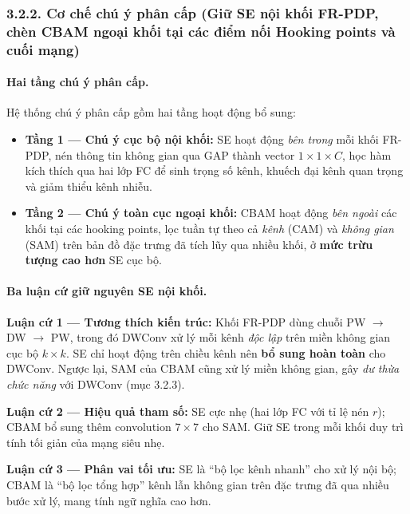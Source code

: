 \documentclass[
]{article}
\begin{document}
\subsubsection{3.2.2. Cơ chế chú ý phân cấp (Giữ SE nội khối FR-PDP, chèn CBAM ngoại khối tại các điểm nối Hooking points và cuối mạng)}\label{3-2-2-hierarchical-attention}

\paragraph{Hai tầng chú ý phân cấp.}

Hệ thống chú ý phân cấp gồm hai tầng hoạt động bổ sung:

\begin{itemize}
\item \textbf{Tầng 1 --- Chú ý cục bộ nội khối:} SE hoạt động \textit{bên trong} mỗi khối FR-PDP, nén thông tin không gian qua GAP thành vector $1 \times 1 \times C$, học hàm kích thích qua hai lớp FC để sinh trọng số kênh, khuếch đại kênh quan trọng và giảm thiểu kênh nhiễu.

\item \textbf{Tầng 2 --- Chú ý toàn cục ngoại khối:} CBAM hoạt động \textit{bên ngoài} các khối tại các hooking points, lọc tuần tự theo cả \textit{kênh} (CAM) và \textit{không gian} (SAM) trên bản đồ đặc trưng đã tích lũy qua nhiều khối, ở \textbf{mức trừu tượng cao hơn} SE cục bộ.
\end{itemize}

\paragraph{Ba luận cứ giữ nguyên SE nội khối.}

\textbf{Luận cứ 1 --- Tương thích kiến trúc:} Khối FR-PDP dùng chuỗi PW $\rightarrow$ DW $\rightarrow$ PW, trong đó DWConv xử lý mỗi kênh \textit{độc lập} trên miền không gian cục bộ $k \times k$. SE chỉ hoạt động trên chiều kênh nên \textbf{bổ sung hoàn toàn} cho DWConv. Ngược lại, SAM của CBAM cũng xử lý miền không gian, gây \textit{dư thừa chức năng} với DWConv (mục 3.2.3).

\textbf{Luận cứ 2 --- Hiệu quả tham số:} SE cực nhẹ (hai lớp FC với tỉ lệ nén $r$); CBAM bổ sung thêm convolution $7 \times 7$ cho SAM. Giữ SE trong mỗi khối duy trì tính tối giản của mạng siêu nhẹ.

\textbf{Luận cứ 3 --- Phân vai tối ưu:} SE là ``bộ lọc kênh nhanh'' cho xử lý nội bộ; CBAM là ``bộ lọc tổng hợp'' kênh lẫn không gian trên đặc trưng đã qua nhiều bước xử lý, mang tính ngữ nghĩa cao hơn.
\end{document}
